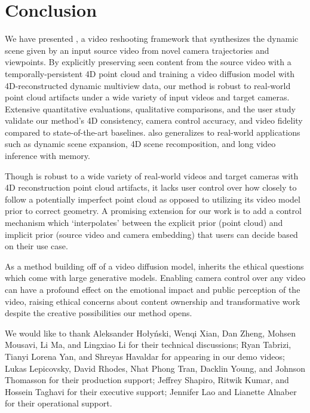 \section{Conclusion}
\label{sec:conclusion}

We have presented \methodname, a video reshooting framework that synthesizes the dynamic scene given by an input source video from novel camera trajectories and viewpoints. By explicitly preserving seen content from the source video with a temporally-persistent 4D point cloud and training a video diffusion model with 4D-reconstructed dynamic multiview data, our method is robust to real-world point cloud artifacts under a wide variety of input videos and target cameras. Extensive quantitative evaluations, qualitative comparisons, and the user study validate our method's 4D consistency, camera control accuracy, and video fidelity compared to state-of-the-art baselines. \methodname also generalizes to real-world applications such as dynamic scene expansion, 4D scene recomposition, and long video inference with memory.

Though \methodname is robust to a wide variety of real-world videos and target cameras with 4D reconstruction point cloud artifacts, it lacks user control over how closely to follow a potentially imperfect point cloud as opposed to utilizing its video model prior to correct geometry. A promising extension for our work is to add a control mechanism which `interpolates' between the explicit prior (point cloud) and implicit prior (source video and camera embedding) that users can decide based on their use case.

As a method building off of a video diffusion model, \methodname inherits the ethical questions which come with large generative models. Enabling camera control over any video can have a profound effect on the emotional impact and public perception of the video, raising ethical concerns about content ownership and transformative work despite the creative possibilities our method opens.

We would like to thank Aleksander Ho\l y\'nski, Wenqi Xian, Dan Zheng, Mohsen Mousavi, Li Ma, and Lingxiao Li for their technical discussions; Ryan Tabrizi, Tianyi Lorena Yan, and Shreyas Havaldar for appearing in our demo videos;  Lukas Lepicovsky, David Rhodes, Nhat Phong Tran, Dacklin Young, and Johnson Thomasson for their production support; Jeffrey Shapiro, Ritwik Kumar, and Hossein Taghavi for their executive support; Jennifer Lao and Lianette Alnaber for their operational support.
